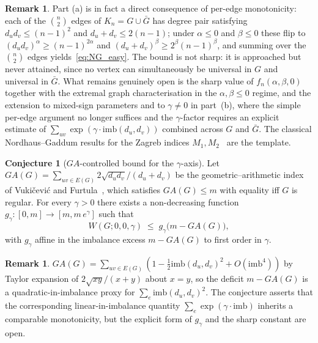\documentclass[11pt,a4paper]{article}
\theoremstyle{definition}
\newtheorem{conjecture}[theorem]{Conjecture}
\newtheorem{remark}[theorem]{Remark}
\begin{document}
\begin{remark}\label{rem:NG_strategy}
Part (a) is in fact a direct consequence of per-edge monotonicity:
each of the $\binom{n}{2}$ edges of $K_n = G \cup \bar G$ has
degree pair satisfying $d_u d_v \le (n-1)^2$ and
$d_u + d_v \le 2(n-1)$; under $\alpha \le 0$ and $\beta \le 0$
these flip to $(d_u d_v)^{\alpha} \ge (n-1)^{2\alpha}$ and
$(d_u + d_v)^{\beta} \ge 2^{\beta}(n-1)^{\beta}$, and summing
over the $\binom{n}{2}$ edges yields~\eqref{eq:NG_easy}. The bound
is not sharp: it is approached but never attained, since no vertex
can simultaneously be universal in $G$ and universal in $\bar G$.
What remains genuinely open is the sharp value of
$f_n(\alpha, \beta, 0)$ together with the extremal graph
characterisation in the $\alpha, \beta \le 0$ regime, and the
extension to mixed-sign parameters and to $\gamma \ne 0$ in
part~(b), where the simple per-edge argument no longer suffices
and the $\gamma$-factor requires an explicit estimate of
$\sum_{uv} \exp(\gamma\cdot\mathrm{imb}(d_u, d_v))$ combined
across $G$ and $\bar G$. The classical Nordhaus--Gaddum results
for the Zagreb indices $M_1, M_2$~\cite{NordhausGaddumOrig1956}
are the template.
\end{remark}

\begin{conjecture}[$GA$-controlled bound for the $\gamma$-axis]\label{conj:GA}
Let $GA(G) = \sum_{uv \in E(G)} 2\sqrt{d_u d_v}/(d_u + d_v)$ be the
geometric--arithmetic index of Vuki\v{c}evi\'c and
Furtula~\cite{VukicevicFurtula2009GA}, which satisfies $GA(G) \le m$ with
equality iff $G$ is regular. For every $\gamma > 0$ there exists a
non-decreasing function
$g_\gamma : [0, m] \to [m, m\, e^{\gamma}]$ such that
\[
W(G; 0, 0, \gamma) \;\le\; g_\gamma\!\bigl(m - GA(G)\bigr),
\]
with $g_\gamma$ affine in the imbalance excess $m - GA(G)$ to first
order in $\gamma$.
\end{conjecture}

\begin{remark}\label{rem:GA_strategy}
$GA(G) = \sum_{uv \in E(G)} (1 - \tfrac{1}{2}\mathrm{imb}(d_u, d_v)^2
+ O(\mathrm{imb}^4))$ by Taylor expansion of $2\sqrt{xy}/(x+y)$
about $x = y$, so the deficit $m - GA(G)$ is a quadratic-in-imbalance
proxy for $\sum_e \mathrm{imb}(d_u, d_v)^2$. The conjecture asserts
that the corresponding linear-in-imbalance quantity
$\sum_e \exp(\gamma\cdot\mathrm{imb})$ inherits a comparable
monotonicity, but the explicit form of $g_\gamma$ and the sharp
constant are open.
\end{remark}
\end{document}
